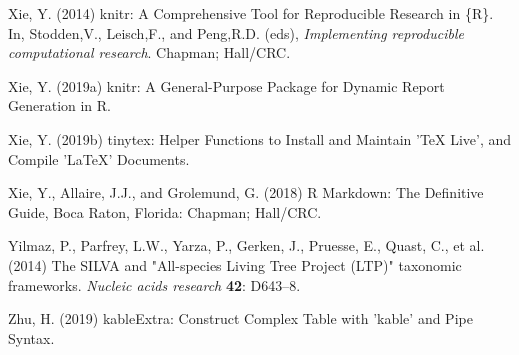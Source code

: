 \documentclass[12pt,]{article}
\begin{document}
\leavevmode\hypertarget{ref-Xie2014}{}%
Xie, Y. (2014) knitr: A Comprehensive Tool for Reproducible Research in
\{R\}. In, Stodden,V., Leisch,F., and Peng,R.D. (eds),
\emph{Implementing reproducible computational research}. Chapman;
Hall/CRC.

\leavevmode\hypertarget{ref-Xie2019a}{}%
Xie, Y. (2019a) knitr: A General-Purpose Package for Dynamic Report
Generation in R.

\leavevmode\hypertarget{ref-Xie2019}{}%
Xie, Y. (2019b) tinytex: Helper Functions to Install and Maintain 'TeX
Live', and Compile 'LaTeX' Documents.

\leavevmode\hypertarget{ref-Xie2018}{}%
Xie, Y., Allaire, J.J., and Grolemund, G. (2018) R Markdown: The
Definitive Guide, Boca Raton, Florida: Chapman; Hall/CRC.

\leavevmode\hypertarget{ref-Yilmaz2014}{}%
Yilmaz, P., Parfrey, L.W., Yarza, P., Gerken, J., Pruesse, E., Quast,
C., et al. (2014) The SILVA and "All-species Living Tree Project (LTP)"
taxonomic frameworks. \emph{Nucleic acids research} \textbf{42}:
D643--8.

\leavevmode\hypertarget{ref-Zhu2019}{}%
Zhu, H. (2019) kableExtra: Construct Complex Table with 'kable' and Pipe
Syntax.
\end{document}
